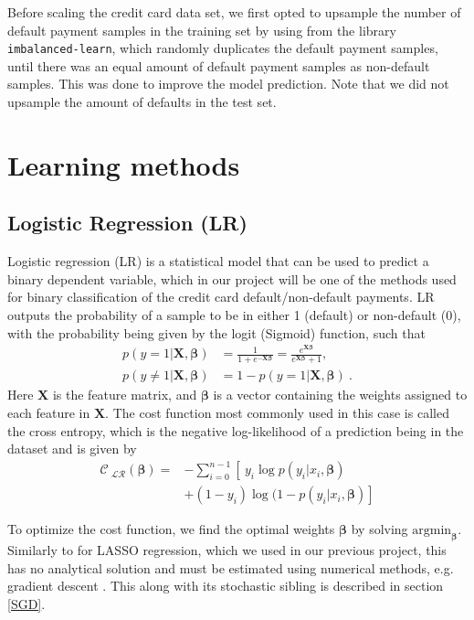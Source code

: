 \documentclass[a4paper, 11pt, twocolumn]{article}
\begin{document}
Before scaling the credit card data set, we first opted to upsample the number of
default payment samples in the training set by using 
from the library \texttt{imbalanced-learn}, which randomly duplicates the default
payment samples, until there was an equal amount of default payment samples as
non-default samples. This was done to improve the model prediction. Note that we
did not upsample the amount of defaults in the test set.


\section{Learning methods}
\subsection{Logistic Regression (LR)}
Logistic regression (LR)  is a statistical model that can be used to predict a
binary dependent variable, which in our project will be one of the methods used
for binary classification of the credit card default/non-default payments. LR
outputs the probability of a sample to be in either 1 (default) or non-default (0),
with the probability being given by the logit (Sigmoid) function, such that
\begin{align}
p(y=1 | \bm{X}, \bm{\beta}) &= \frac{1}{1 + e^{-\bm{X} \bm{\beta}}} =
\frac{e^{\bm{X} \bm{\beta}}}{e^{\bm{X} \bm{\beta}}+1},\\
p(y\neq1 | \bm{X}, \bm{\beta}) &= 1 - p(y=1 | \bm{X}, \bm{\beta})\ .
\label{eq:LR_probability}
\end{align}
Here $\bm{X}$ is the feature matrix, and $\bm{\beta}$ is a vector containing the weights
assigned to each feature in $\bm{X}$.  The cost function most commonly used in this
case is called the cross entropy, which is the negative log-likelihood of a prediction
being in the dataset and is given by
\begin{align}
\mathcal{C_\text{ LR}}(\bm{\beta}) =& -\sum_{i=0}^{n-1} \left[\  y_i\log p(y_i|x_i, \bm{\beta}) \right. \nonumber\\
 &\left.+ (1-y_i)\log(1-p(y_i|x_i,\bm{\beta})    \right]
\end{align}


To optimize the cost function, we find the optimal weights $\bm{\beta}$ by
solving $\text{argmin}_{\bm{\beta}}$. Similarly to for LASSO regression, which
we used in our previous project, this has no analytical solution and must be
estimated using numerical methods, e.g. gradient descent \cite{regpaper}. This
along with its stochastic sibling is described in section \ref{SGD}.
\end{document}
